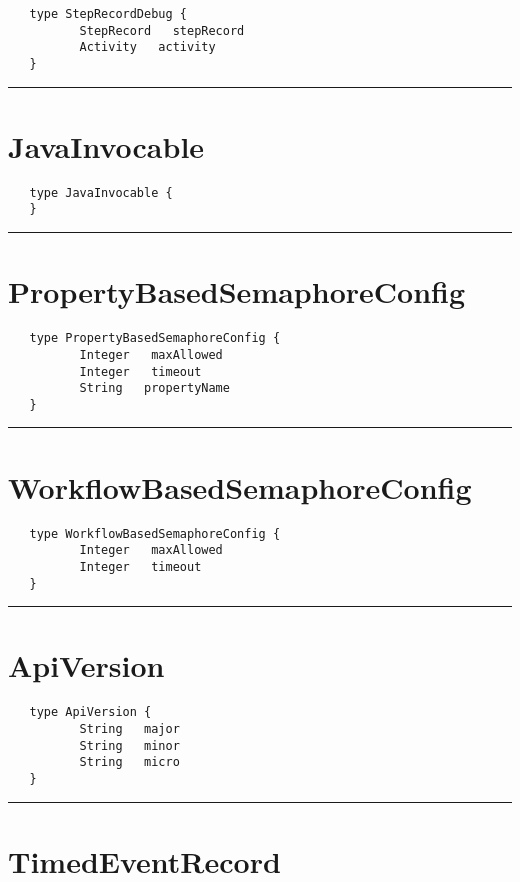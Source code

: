 \begin{verbatim}
   type StepRecordDebug {
          StepRecord   stepRecord
          Activity   activity
   }
\end{verbatim}

\rule{12cm}{2pt}
\section{JavaInvocable}
\label{type:JavaInvocable}

\begin{verbatim}
   type JavaInvocable {
   }
\end{verbatim}

\rule{12cm}{2pt}
\section{PropertyBasedSemaphoreConfig}
\label{type:PropertyBasedSemaphoreConfig}

\begin{verbatim}
   type PropertyBasedSemaphoreConfig {
          Integer   maxAllowed
          Integer   timeout
          String   propertyName
   }
\end{verbatim}

\rule{12cm}{2pt}
\section{WorkflowBasedSemaphoreConfig}
\label{type:WorkflowBasedSemaphoreConfig}

\begin{verbatim}
   type WorkflowBasedSemaphoreConfig {
          Integer   maxAllowed
          Integer   timeout
   }
\end{verbatim}

\rule{12cm}{2pt}
\section{ApiVersion}
\label{type:ApiVersion}

\begin{verbatim}
   type ApiVersion {
          String   major
          String   minor
          String   micro
   }
\end{verbatim}

\rule{12cm}{2pt}
\section{TimedEventRecord}
\label{type:TimedEventRecord}

